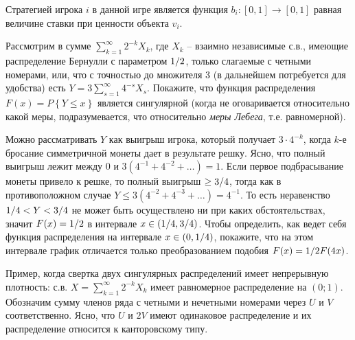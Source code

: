 \begin{ordre}
Стратегией игрока $i$ в данной игре является функция $b_i: [0, 1] \rightarrow [0, 1]$ равная величине ставки при ценности объекта  $v_i$.
\end{ordre}


\begin{problem}
Рассмотрим в сумме $\sum_{k=1}^\infty 2^{-k} X_{k}$, где $X_{k} $ -- взаимно независимые с.в., имеющие распределение Бернулли с параметром ${1\mathord{\left/ {\vphantom {1 2}} \right. \kern-\nulldelimiterspace} 2} $, только слагаемые с четными номерами, или, что с точностью до множителя 3 (в дальнейшем потребуется для удобства) есть $Y=3\sum _{s=1}^{\infty }4^{-s} X_{s}  $. Покажите, что функция распределения $F(x)=P\left\{Y\le x\right\}$ является сингулярной (когда не оговаривается относительно какой меры, подразумевается, что относительно \textit{меры Лебега}, т.е. равномерной).


\begin{ordre}
Можно рассматривать $Y$ как выигрыш игрока, который получает $3\cdot 4^{-k} $, когда $k$-е бросание симметричной монеты дает в результате решку. Ясно, что полный выигрыш лежит между 0 и $3\left(4^{-1} +4^{-2} +\ldots \right)=1$. Если первое подбрасывание монеты привело к решке, то полный выигрыш $\ge {3\mathord{\left/ {\vphantom {3 4}} \right. \kern-\nulldelimiterspace} 4} $, тогда как в противоположном случае $Y\le 3\left(4^{-2} +4^{-3} +\ldots \right)=4^{-1} $. То есть неравенство ${1\mathord{\left/ {\vphantom {1 4}} \right. \kern-\nulldelimiterspace} 4} <Y<{3\mathord{\left/ {\vphantom {3 4}} \right. \kern-\nulldelimiterspace} 4} $ не может быть осуществлено ни при каких обстоятельствах, значит $F(x)={1\mathord{\left/ {\vphantom {1 2}} \right. \kern-\nulldelimiterspace} 2} $ в интервале $x\in \left({1\mathord{\left/ {\vphantom {1 4}} \right. \kern-\nulldelimiterspace} 4} ,{3\mathord{\left/ {\vphantom {3 4}} \right. \kern-\nulldelimiterspace} 4} \right)$. Чтобы определить, как ведет себя функция распределения на интервале $x\in \left(0,{1\mathord{\left/ {\vphantom {1 4}} \right. \kern-\nulldelimiterspace} 4} \right)$, покажите, что на этом интервале график отличается только преобразованием подобия $F(x)={1\mathord{\left/ {\vphantom {1 2}} \right. \kern-\nulldelimiterspace} 2} F(4x)$.

\end{ordre}

\begin{remark}
Пример, когда свертка двух сингулярных распределений имеет непрерывную плотность: с.в. $X=\sum _{k=1}^{\infty }2^{-k} X_{k}  $ имеет равномерное распределение на $\left(0;1\right)$. Обозначим сумму членов ряда с четными и нечетными номерами через $U$ и $V$ соответственно. Ясно, что $U$ и $2V$ имеют одинаковое распределение и их распределение относится к канторовскому типу.
\end{remark}

\end{problem}


